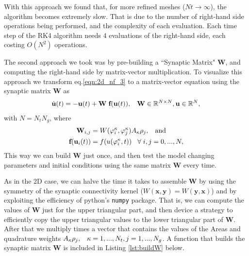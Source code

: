 \documentclass{uonmathreport}
\begin{document}
With this approach we found that, for more refined meshes ($Nt \rightarrow \infty$), the algorithm becomes extremely slow. That is due to the number of right-hand side operations being performed, and the complexity of each evaluation. Each time step of the RK4 algorithm needs 4 evaluations of the right-hand side, each costing $O(N^2)$ operations.

The second approach we took was by pre-building a ``Synaptic Matrix" $\mathbf{W}$, and computing the right-hand side by matrix-vector multiplication. To visualize this approach we transform eq.\ref{eqn:2d_nf_3} to a matrix-vector equation using the synaptic matrix $\mathbf{W}$ as
\begin{equation}\label{eqn:2d_tri_mat-vec}
\dot{\textbf{u}}(t) = - \textbf{u}(t) + \textbf{W} \hspace{1mm} \textbf{f}(\textbf{u}(t)), \hspace{3mm} \textbf{W} \in \mathbb{R}^{N \times N}, \textbf{u} \in \mathbb{R}^{N},
\end{equation}
with $N=N_tN_g$, where
\begin{subequations}\label{eqn:2d_tri_w&f}
	\begin{align}
		\mathbf{W}_{i,j} &= W(\varphi^{\kappa}_i, \varphi^{\kappa}_j) A_{\kappa} \rho_j , 
		\hspace{3mm} \textnormal{and}\\
		\textbf{f}(\mathbf{u}_i(t)) &= f(u(\varphi^{\kappa}_i,t))
		\hspace{3mm} \forall \hspace{1mm} i,j = 0,...,N,
	\end{align}
\end{subequations}
This way we can build $\mathbf{W}$ just once, and then test the model changing parameters and initial conditions using the same matrix $\mathbf{W}$ every time.

As in the 2D case, we can halve the time it takes to assemble $\mathbf{W}$ by using the symmetry of the synaptic connectivity kernel ($W(\textbf{x}, \textbf{y}) = W(\textbf{y},\textbf{x})$) and by exploiting the efficiency of python's \texttt{numpy} package. That is, we can compute the values of $\mathbf{W}$ just for the upper triangular part, and then device a strategy to efficiently copy the upper triangular values to the lower triangular part of $\mathbf{W}$. After that we multiply times a vector that contains the values of the Areas and quadrature weights $A_{\kappa}\rho_j, \hspace{3mm} \kappa=1,...,N_t, j=1,...,N_g$. A function that builds the synaptic matrix $\mathbf{W}$ is included in Listing \ref{lst:buildW} below.
\end{document}
